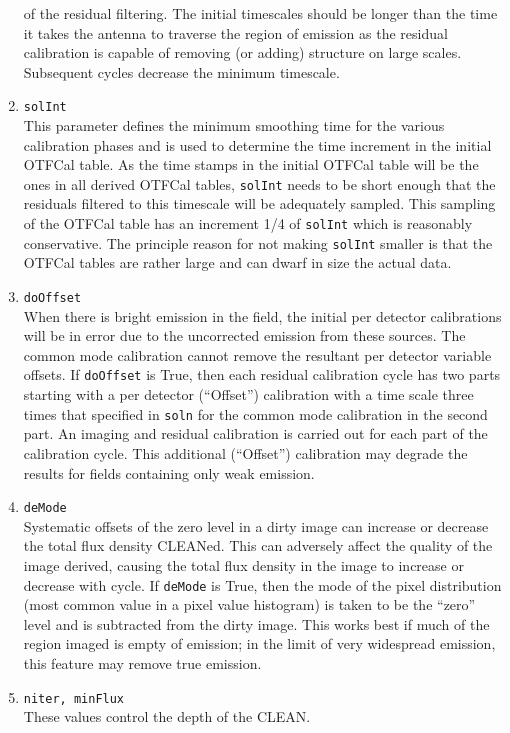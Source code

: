 \documentclass[11pt]{report}
\begin{document}
\begin{enumerate}
of the residual filtering.
The initial timescales should be longer than the time it takes the
antenna to traverse the region of emission as the residual calibration
is capable of removing (or adding) structure on large scales.
Subsequent cycles decrease the minimum timescale.
\item {\tt solInt} \\
This parameter defines the minimum smoothing time for the various
calibration phases and is used to determine the time increment in the
initial OTFCal table.
As the time stamps in the initial OTFCal table will be the ones in all
derived OTFCal tables, {\tt solInt} needs to be short enough that the
residuals filtered to this timescale will be adequately sampled.
This sampling of the OTFCal table has an increment 1/4 of {\tt solInt}
which is reasonably conservative.
The principle reason for not making {\tt solInt} smaller is that the
OTFCal tables are rather large and can dwarf in size the actual data.
\item {\tt doOffset} \\
When there is bright emission in the field, the initial per detector
calibrations will be in error due to the uncorrected emission from these
sources.
The common mode calibration cannot remove the resultant per detector
variable offsets.
If {\tt doOffset} is True, then each residual calibration cycle has
two parts starting with a per detector (``Offset'') calibration with a
time scale three times that specified in {\tt soln} for the common
mode calibration in the second part.
An imaging and residual calibration is carried out for each part of
the calibration cycle.
This additional (``Offset'') calibration may degrade the results for
fields containing only weak emission.
\item {\tt deMode} \\
Systematic offsets of the zero level in a dirty image can increase or
decrease the total flux density CLEANed.
This can adversely affect the quality of the image derived, causing
the total flux density in the image to increase or decrease with
cycle.
If {\tt deMode} is True, then the mode of the pixel distribution (most
common value in a pixel value histogram) is taken to be the ``zero''
level and is subtracted from the dirty image.
This works best if much of the region imaged is empty of emission; in
the limit of very widespread emission, this feature may remove true
emission.
\item {\tt niter, minFlux } \\
These values control the depth of the CLEAN.

\end{enumerate}
\end{document}
